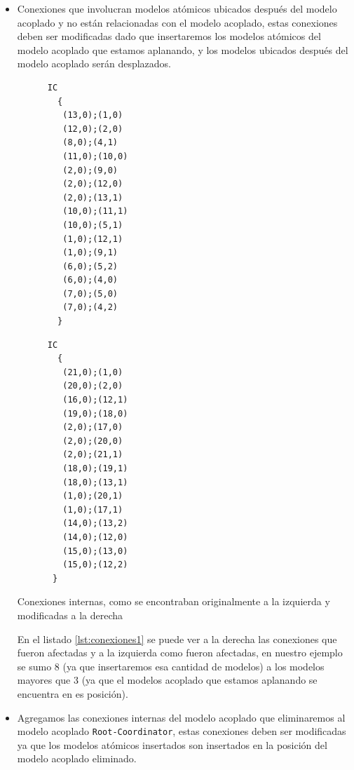\begin{itemize}
        \item Conexiones que involucran modelos atómicos ubicados después del modelo acoplado y no están relacionadas con el modelo acoplado, 
        estas conexiones deben ser modificadas dado que insertaremos los modelos atómicos del modelo acoplado que estamos aplanando, y los modelos 
        ubicados después del modelo acoplado serán desplazados.
        
\begin{listing}[H]
        \begin{minipage}{0.5\textwidth}
\begin{verbatim}
      IC
        {
         (13,0);(1,0)
         (12,0);(2,0)
         (8,0);(4,1)
         (11,0);(10,0)
         (2,0);(9,0)
         (2,0);(12,0)
         (2,0);(13,1)
         (10,0);(11,1)
         (10,0);(5,1)
         (1,0);(12,1)
         (1,0);(9,1)
         (6,0);(5,2)
         (6,0);(4,0)
         (7,0);(5,0)
         (7,0);(4,2)
        }
\end{verbatim}
        \end{minipage}
        \begin{minipage}{0.5\textwidth}
\begin{verbatim}
      IC
        {
         (21,0);(1,0)
         (20,0);(2,0)
         (16,0);(12,1)
         (19,0);(18,0)
         (2,0);(17,0)
         (2,0);(20,0)
         (2,0);(21,1)
         (18,0);(19,1)
         (18,0);(13,1)
         (1,0);(20,1)
         (1,0);(17,1)
         (14,0);(13,2)
         (14,0);(12,0)
         (15,0);(13,0)
         (15,0);(12,2)
       }
\end{verbatim}
        \end{minipage}
\label{lst:conexiones1}
\caption{Conexiones internas, como se encontraban originalmente a la izquierda y modificadas a la derecha}
\end{listing}

        En el listado \ref{lst:conexiones1} se puede ver a la derecha las conexiones que fueron afectadas y a la izquierda como fueron afectadas, en nuestro ejemplo
        se sumo $8$ (ya que insertaremos esa cantidad de modelos) a los modelos mayores que $3$ (ya que el modelos acoplado que estamos aplanando se encuentra en 
        es posición).

        \item Agregamos las conexiones internas del modelo acoplado que eliminaremos al modelo acoplado \texttt{Root-Coordinator}, estas conexiones deben ser 
        modificadas ya que los modelos atómicos insertados son insertados en la posición del modelo acoplado eliminado.


\end{itemize}
